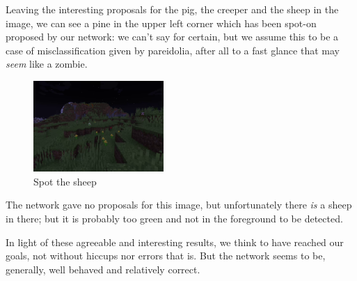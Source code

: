 \documentclass[10pt,journal,cspaper,compsoc]{IEEEtran}
\begin{document}
    Leaving the interesting proposals for the pig, the creeper and the sheep in the image, we can see a pine in the upper left corner which has been spot-on proposed by our network: we can't say for certain, but we assume this to be a case of misclassification given by pareidolia, after all to a fast glance that may \emph{seem} like a zombie.

    \newpage
    \begin{figure}[h]
        \centering
        \includegraphics[width=0.44\textwidth]{images/spot_sheep.png}
        \caption{Spot the sheep}
    \end{figure}

    The network gave no proposals for this image, but unfortunately there \emph{is} a sheep in there; but it is probably too green and not in the foreground to be detected.

    In light of these agreeable and interesting results, we think to have reached our goals, not without hiccups nor errors that is. But the network seems to be, generally, well behaved and relatively correct.



    
    
\end{document}
